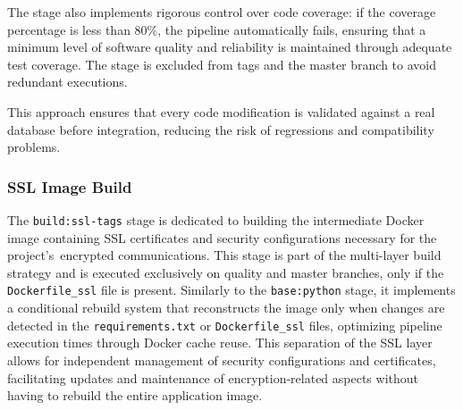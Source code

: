 The stage also implements rigorous control over code coverage: if the coverage percentage is less than 80\%, the pipeline automatically fails, ensuring that a minimum level of software quality and reliability is maintained through adequate test coverage. The stage is excluded from tags and the master branch to avoid redundant executions.

This approach ensures that every code modification is validated against a real database before integration, reducing the risk of regressions and compatibility problems.

\subsubsection{SSL Image Build}
The \texttt{build:ssl-tags} stage is dedicated to building the intermediate Docker image containing SSL certificates and security configurations necessary for the project's~encrypted communications. This stage is part of the multi-layer build strategy and is executed exclusively on quality and master branches, only if the \texttt{Dockerfile\_ssl} file is present. Similarly to the \texttt{base:python} stage, it implements a conditional rebuild system that reconstructs the image only when changes are detected in the \texttt{requirements.txt} or \texttt{Dockerfile\_ssl} files, optimizing pipeline execution times through Docker cache reuse.
This separation of the SSL layer allows for independent management of security configurations and certificates, facilitating updates and maintenance of encryption-related aspects without having to rebuild the entire application image.

